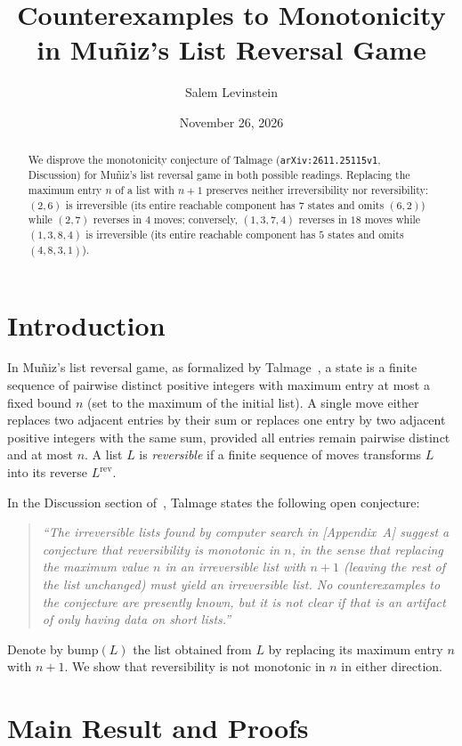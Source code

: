 \documentclass[11pt]{article}
\title{Counterexamples to Monotonicity in Mu\~{n}iz's List Reversal Game}
\author{Salem Levinstein}
\date{November 26, 2026}
\begin{document}
\maketitle

\begin{abstract}
We disprove the monotonicity conjecture of Talmage (\texttt{arXiv:2611.25115v1}, Discussion) for Mu\~{n}iz's list reversal game in both possible readings. Replacing the maximum entry $n$ of a list with $n + 1$ preserves neither irreversibility nor reversibility: $(2, 6)$ is irreversible (its entire reachable component has $7$ states and omits $(6, 2)$) while $(2, 7)$ reverses in $4$ moves; conversely, $(1, 3, 7, 4)$ reverses in $18$ moves while $(1, 3, 8, 4)$ is irreversible (its entire reachable component has $5$ states and omits $(4, 8, 3, 1)$).
\end{abstract}

\section{Introduction}

In Mu\~{n}iz's list reversal game, as formalized by Talmage~\cite{Talmage2026}, a state is a finite sequence of pairwise distinct positive integers with maximum entry at most a fixed bound $n$ (set to the maximum of the initial list). A single move either replaces two adjacent entries by their sum or replaces one entry by two adjacent positive integers with the same sum, provided all entries remain pairwise distinct and at most $n$. A list $L$ is \emph{reversible} if a finite sequence of moves transforms $L$ into its reverse $L^{\mathrm{rev}}$.

In the Discussion section of~\cite{Talmage2026}, Talmage states the following open conjecture:
\begin{quote}
\emph{``The irreversible lists found by computer search in [Appendix~A] suggest a conjecture that reversibility is monotonic in $n$, in the sense that replacing the maximum value $n$ in an irreversible list with $n+1$ (leaving the rest of the list unchanged) must yield an irreversible list. No counterexamples to the conjecture are presently known, but it is not clear if that is an artifact of only having data on short lists.''}
\end{quote}
Denote by $\mathrm{bump}(L)$ the list obtained from $L$ by replacing its maximum entry $n$ with $n + 1$. We show that reversibility is not monotonic in $n$ in either direction.

\section{Main Result and Proofs}
\end{document}
